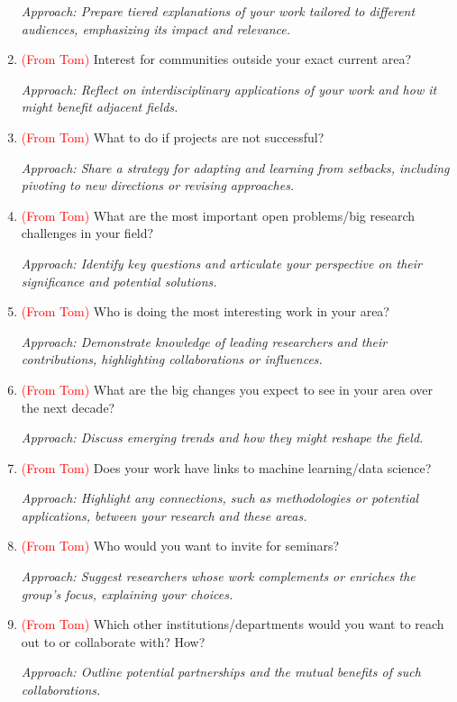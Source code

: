 \documentclass[12pt]{article}
\numberwithin{equation}{section}
\newcommand{\red}[1]{\textcolor{red}{#1}}
\begin{document}
\begin{enumerate}
    \textit{Approach: Prepare tiered explanations of your work tailored to different audiences, emphasizing its impact and relevance.}

    \item \red{(From Tom)} Interest for communities outside your exact current area?
    
    \textit{Approach: Reflect on interdisciplinary applications of your work and how it might benefit adjacent fields.}

    \item \red{(From Tom)} What to do if projects are not successful?
    
    \textit{Approach: Share a strategy for adapting and learning from setbacks, including pivoting to new directions or revising approaches.}

    \item \red{(From Tom)} What are the most important open problems/big research challenges in your field?
    
    \textit{Approach: Identify key questions and articulate your perspective on their significance and potential solutions.}

    \item \red{(From Tom)} Who is doing the most interesting work in your area?
    
    \textit{Approach: Demonstrate knowledge of leading researchers and their contributions, highlighting collaborations or influences.}

    \item \red{(From Tom)} What are the big changes you expect to see in your area over the next decade?
    
    \textit{Approach: Discuss emerging trends and how they might reshape the field.}

    \item \red{(From Tom)} Does your work have links to machine learning/data science?
    
    \textit{Approach: Highlight any connections, such as methodologies or potential applications, between your research and these areas.}

    \item \red{(From Tom)} Who would you want to invite for seminars?
    
    \textit{Approach: Suggest researchers whose work complements or enriches the group’s focus, explaining your choices.}

    \item \red{(From Tom)} Which other institutions/departments would you want to reach out to or collaborate with? How?
    
    \textit{Approach: Outline potential partnerships and the mutual benefits of such collaborations.}

    
\end{enumerate}
\end{document}
